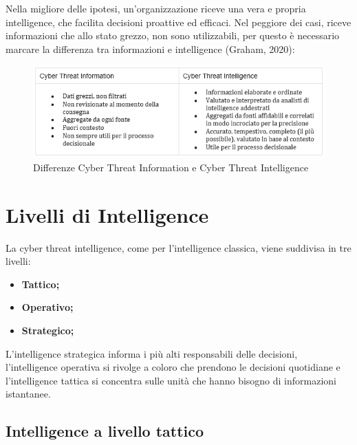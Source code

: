 Nella migliore delle ipotesi, un'organizzazione riceve una vera e propria intelligence, che facilita decisioni proattive ed efficaci.
Nel peggiore dei casi, riceve informazioni che allo stato grezzo, non sono utilizzabili, per questo è necessario marcare la differenza tra informazioni e intelligence (Graham, 2020):


\begin{figure}[h]
\begin{center}
\includegraphics[width=0.95\columnwidth]{images/3_CTI_img/infoIntellDiff.png}
\end{center}
\caption{Differenze Cyber Threat Information e Cyber Threat Intelligence}
\label{fig:Differenze Cyber Threat Information e Cyber Threat Intelligence }
\end{figure}


\section{Livelli di Intelligence}
\label{sec:Livelli di Intelligence}


La cyber threat intelligence, come per l'intelligence classica, viene suddivisa in tre livelli: 

\begin{itemize}
    \item\textbf{Tattico;}
    \item\textbf{Operativo;}
    \item\textbf{Strategico;}
\end{itemize}


L'intelligence strategica informa i più alti responsabili delle decisioni, l'intelligence operativa si rivolge a coloro che prendono le decisioni quotidiane e l'intelligence tattica si concentra sulle unità che hanno bisogno di informazioni istantanee. 

\newpage

\subsection{Intelligence a livello tattico}

